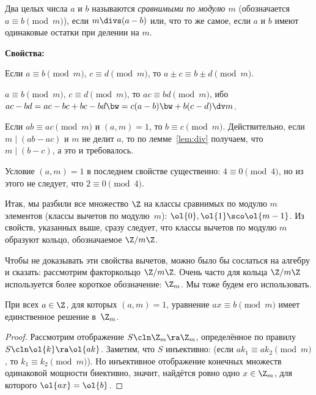 \documentclass[a4paper]{article}
\begin{document}
\begin{df}
Два целых числа $a$ и $b$ называются \emph{сравнимыми по модулю $m$} (обозначается $a\equiv b \pmod{m}$), если
$m\divs(a-b)$ или, что то же самое, если $a$ и $b$ имеют одинаковые остатки при делении на $m$.
\end{df}

\textbf{Свойства:}
\begin{nums}{-2}
\item Если $a\equiv b\pmod{m}$, $c\equiv d\pmod{m}$, то $a\pm c\equiv b\pm d\pmod{m}$.
\item $a\equiv b\pmod{m}$, $c\equiv d\pmod{m}$, то $ac\equiv bd\pmod{m}$, ибо $ac-bd=ac-bc+bc-bd\bw=c(a-b)\bw+b(c-d)\dv m$.
\item Если $ab\equiv ac\pmod{m}$ и $(a,m)=1$, то $b\equiv c\pmod{m}$. Действительно, если
      $m\mid(ab-ac)$ и $m$ не делит $a$, то по лемме~\ref{lem:div} получаем, что $m\mid(b-c)$, а это и требовалось.
\end{nums}

\begin{note}
Условие $(a,m)=1$ в последнем свойстве существенно: $4\equiv 0\pmod{4}$, но из этого не следует, что $2\equiv 0\pmod{4}$.
\end{note}

Итак, мы разбили все множество $\Z$ на классы сравнимых по модулю $m$ элементов (классы вычетов по модулю~$m$):
$\ol{0},\ol{1}\sco \ol{m-1}$. Из свойств, указанных выше, сразу следует, что классы вычетов по модулю $m$ образуют кольцо,
обозначаемое $\Z/m\Z$.

\begin{petit}
Чтобы не доказывать эти свойства вычетов, можно было бы сослаться на алгебру и сказать: рассмотрим факторкольцо $\Z/m\Z$.
Очень часто для кольца $\Z/m\Z$ используется более короткое обозначение: $\Z_m$. Мы тоже будем его использовать.
\end{petit}

\begin{lemma}
    При всех $a\in\Z$, для которых $(a,m)=1$, уравнение $ax\equiv b\pmod{m}$ имеет единственное решение в~$\Z_m$.
\end{lemma}
\begin{proof}
Рассмотрим отображение $S\cln \Z_m \ra \Z_m$, определённое по правилу $S\cln\ol{k}\ra \ol{ak}$.
Заметим, что $S$ инъективно: (если $ak_1\equiv ak_2\pmod{m}$, то $k_1\equiv k_2\pmod{m}$).
Но инъективное отображение конечных множеств одинаковой мощности биективно, значит, найдётся ровно одно $x\in \Z_m$, для которого $\ol{ax} = \ol{b}$.
\end{proof}
\end{document}
